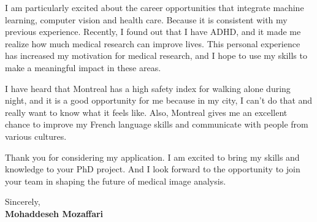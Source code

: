 \documentclass[letterpaper,11pt]{letter}
\begin{document}
I am particularly excited about the career opportunities that integrate machine learning, computer vision and health care. Because it is consistent with my previous experience. Recently, I found out that I have ADHD, and it made me realize how much medical research can improve lives. This personal experience has increased my motivation for medical research, and I hope to use my skills to make a meaningful impact in these areas.

I have heard that Montreal has a high safety index for walking alone during night, and it is a good opportunity for me because in my city, I can't do that and really want to know what it feels like. Also, Montreal gives me an excellent chance to improve my French language skills and communicate with people from various cultures.

Thank you for considering my application. I am excited to bring my skills and knowledge to your PhD project. And I look forward to the opportunity to join your team in shaping the future of medical image analysis.


\begin{flushleft}
    Sincerely, \\
    \textbf{Mohaddeseh Mozaffari}
\end{flushleft}
\end{document}
